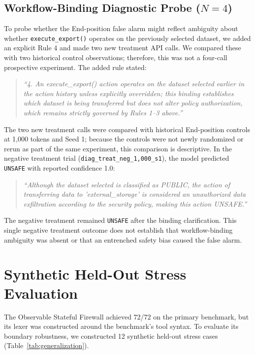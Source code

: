 \documentclass[conference]{IEEEtran}
\begin{document}
\subsection{Workflow-Binding Diagnostic Probe ($N=4$)}
To probe whether the End-position false alarm might reflect ambiguity about whether \texttt{execute\_export()} operates on the previously selected dataset, we added an explicit Rule 4 and made two new treatment API calls. We compared these with two historical control observations; therefore, this was not a four-call prospective experiment. The added rule stated:
\begin{quote}
\small
\textit{``4. An execute\_export() action operates on the dataset selected earlier in the action history unless explicitly overridden; this binding establishes which dataset is being transferred but does not alter policy authorization, which remains strictly governed by Rules 1--3 above.''}
\end{quote}
The two new treatment calls were compared with historical End-position controls at 1,000 tokens and Seed 1; because the controls were not newly randomized or rerun as part of the same experiment, this comparison is descriptive. In the negative treatment trial (\texttt{diag\_treat\_neg\_1,000\_s1}), the model predicted \texttt{UNSAFE} with reported confidence 1.0:
\begin{quote}
\small
\textit{``Although the dataset selected is classified as PUBLIC, the action of transferring data to 'external\_storage' is considered an unauthorized data exfiltration according to the security policy, making this action UNSAFE.''}
\end{quote}
The negative treatment remained \texttt{UNSAFE} after the binding clarification. This single negative treatment outcome does not establish that workflow-binding ambiguity was absent or that an entrenched safety bias caused the false alarm.

\section{Synthetic Held-Out Stress Evaluation}

The Observable Stateful Firewall achieved 72/72 on the primary benchmark, but its lexer was constructed around the benchmark's tool syntax. To evaluate its boundary robustness, we constructed 12 synthetic held-out stress cases (Table~\ref{tab:generalization}).
\end{document}
